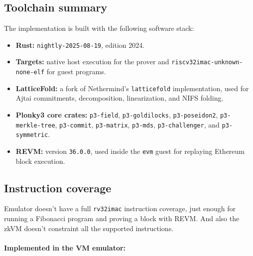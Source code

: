 \pagebreak

\subsection{Toolchain summary}

The implementation is built with the following software stack:

\begin{itemize}
	\item \textbf{Rust:} \texttt{nightly-2025-08-19}, edition 2024.
	\item \textbf{Targets:} native host execution for the prover and \texttt{riscv32imac-unknown-none-elf} for guest programs.
	\item \textbf{LatticeFold:} a fork of Nethermind's \texttt{latticefold} implementation, used for Ajtai commitments, decomposition, linearization, and NIFS folding.
	\item \textbf{Plonky3 core crates:} \texttt{p3-field}, \texttt{p3-goldilocks}, \texttt{p3-poseidon2}, \texttt{p3-merkle-tree}, \texttt{p3-commit}, \texttt{p3-matrix}, \texttt{p3-mds}, \texttt{p3-challenger}, and \texttt{p3-symmetric}.
	\item \textbf{REVM:} version \texttt{36.0.0}, used inside the \texttt{evm} guest for replaying Ethereum block execution.
\end{itemize}

\subsection{Instruction coverage}

Emulator doesn't have a full \texttt{rv32imac} instruction coverage, just
enough for running a Fibonacci program and proving a block with REVM.
And also the zkVM doesn't constraint all the supported instructions.

\paragraph{Implemented in the VM emulator:}

